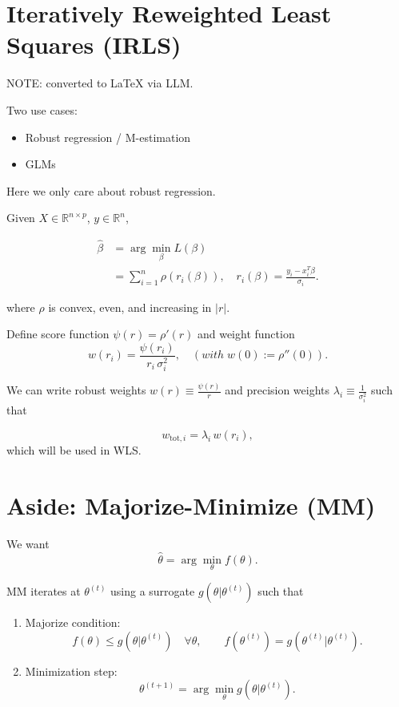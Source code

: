 \documentclass{article}
\begin{document}
\section*{Iteratively Reweighted Least Squares (IRLS)}

NOTE: converted to LaTeX via LLM.

Two use cases: 
\begin{itemize}
    \item Robust regression / M-estimation
    \item GLMs
\end{itemize}

Here we only care about robust regression.

Given $X \in \mathbb{R}^{n \times p}$, $y \in \mathbb{R}^n$,

\begin{align*}
    \hat{\beta} &= \arg \min_\beta L(\beta) \\
    &= \sum_{i=1}^n \rho(r_i(\beta)), \quad 
    r_i(\beta) = \frac{y_i - x_i^T \beta}{\sigma_i}.
\end{align*}

where $\rho$ is convex, even, and increasing in $|r|$.

Define score function $\psi(r) = \rho'(r)$ and weight function
\[
w(r_i) = \frac{\psi(r_i)}{r_i \, \sigma_i^2}, 
\quad (with \; w(0) := \rho''(0)).
\]

We can write robust weights $w(r) \equiv \frac{\psi(r)}{r}$ 
and precision weights $\lambda_i \equiv \tfrac{1}{\sigma_i^2}$ such that

\[
w_{\text{tot}, i} = \lambda_i \, w(r_i),
\]
which will be used in WLS.

\section*{Aside: Majorize-Minimize (MM)}

We want 
\[
\hat{\theta} = \arg\min_\theta f(\theta).
\]

MM iterates at $\theta^{(t)}$ using a surrogate $g(\theta|\theta^{(t)})$ such that

\begin{enumerate}
    \item Majorize condition:
    \[
    f(\theta) \le g(\theta|\theta^{(t)}) \quad \forall \theta, 
    \qquad f(\theta^{(t)}) = g(\theta^{(t)}|\theta^{(t)}).
    \]
    \item Minimization step:
    \[
    \theta^{(t+1)} = \arg\min_\theta g(\theta|\theta^{(t)}).
    \]
\end{enumerate}
\end{document}
